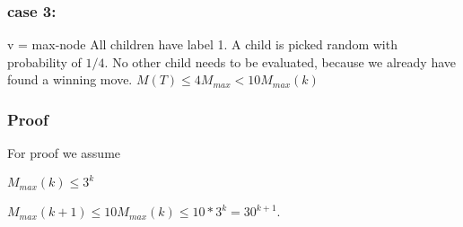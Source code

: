 \documentclass[11pt]{article}
\newcommand\tab[1][0.5cm]{\hspace*{#1}}
\begin{document}
\subsubsection*{case 3:}

\tab v = max-node \newline
\tab All children have label 1. \newline
\tab A child is picked random with probability of $1/4$. \newline
\tab No other child needs to be evaluated, because we already have found a winning move. \newline
\tab $M(T) \leq 4M_{max} < 10M_{max}(k)$

\subsubsection*{Proof}
For proof we assume \newline

\tab \tab $M_{max}(k) \leq 3^{k}$ \newline

$M_{max}(k+1) \leq 10M_{max}(k) \leq 10 * 3^{k} = 30^{k+1}$.
\end{document}
